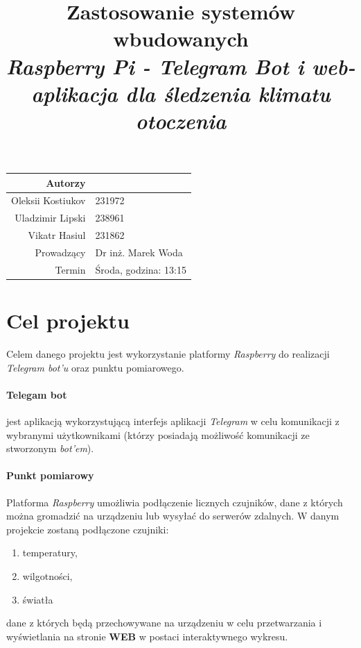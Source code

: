 \documentclass[a4paper]{article}
\title{
	\textbf{Zastosowanie systemów wbudowanych}\\
	\textit{Raspberry Pi - Telegram Bot i web-aplikacja dla śledzenia klimatu otoczenia}
	}
\date{}
\begin{document}
\begin{table}
	\vspace{-2cm}
	\begin{tabular}{rl}
		Autorzy & \\
			\hline
		Oleksii Kostiukov  	& 231972\\
		Uladzimir Lipski	& 238961\\
		Vikatr Hasiul 		& 231862\\[0.4cm]
			\hline
		Prowadzący 	& Dr inż. Marek Woda \\
		Termin		& Środa, godzina: 13:15\\
	\end{tabular}
\end{table}

{\let\newpage\relax\maketitle}
\maketitle
\thispagestyle{empty} %

\maketitle
\newpage
\section{Cel projektu}
	Celem danego projektu jest wykorzystanie platformy \textit{Raspberry} 
	do realizacji \textit{Telegram bot'u} oraz punktu pomiarowego.

	\paragraph{Telegam bot} jest aplikacją wykorzystującą interfejs aplikacji \textit{Telegram}
	w celu komunikacji z wybranymi użytkownikami (którzy posiadają możliwość komunikacji ze stworzonym
	\textit{bot'em}).

	\paragraph{Punkt pomiarowy} Platforma \textit{Raspberry} umożliwia podłączenie licznych
	czujników, dane z których można gromadzić na urządzeniu lub wysyłać do serwerów zdalnych.
	W danym projekcie zostaną podłączone czujniki:
	\begin{enumerate}
		\item temperatury,
		\item wilgotności,
		\item światła
	\end{enumerate}
	dane z których będą przechowywane na urządzeniu w celu przetwarzania i 
	wyświetlania na stronie \textbf{WEB} w postaci interaktywnego wykresu.
	
\end{document}
